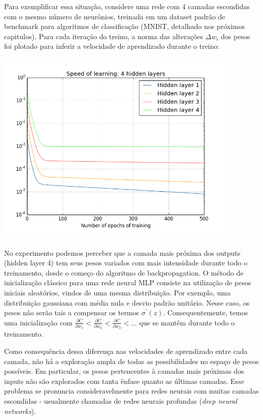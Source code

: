 \documentclass[
	12pt,				%
	oneside,			%
	a4paper,			%
	english,			%
	french,				%
	spanish,			%
	brazil,				%
	]{abntex2}
\begin{document}
Para exemplificar essa situação, considere uma rede com 4 camadas escondidas com o mesmo número de neurônios, treinada em um dataset padrão de benchmark para algoritmos de classificação (MNIST, detalhado nos próximos capitulos). Para cada iteração do treino, a norma das alterações $\Delta w_i$ dos pesos foi plotado para inferir a velocidade de aprendizado durante o treino:

\begin{center}
	\includegraphics[scale=0.8]{vanishinggradient.png}
\end{center}

No experimento podemos perceber que a camada mais próxima dos outputs (hidden layer 4) tem seus pesos variados com mais intensidade durante todo o treinamento, desde o começo do algoritmo de backpropagation. O método de inicialização clássico para uma rede neural MLP consiste na utilização de pesos iniciais aleatórios, vindos de uma mesma distribuição. Por exemplo, uma distribuição gaussiana com média nula e desvio padrão unitário. Nesse caso, os pesos não serão tais a compensar os termos $\sigma^{'}(z)$. Consequentemente, temos uma inicialização com $\frac{\partial C}{\partial w_1} < \frac{\partial C}{\partial w_2} < \frac{\partial C}{\partial w_3} < ... $ que se mantêm durante todo o treinamento.

Como consequência dessa diferença nas velocidades de aprendizado entre cada camada, não há a exploração ampla de todas as possibilidades no espaço de pesos possíveis. Em particular, os pesos pertencentes à camadas mais próximas dos inputs não são explorados com tanta ênfase quanto as últimas camadas. Esse problema se pronuncia consideravelmente para redes neurais com muitas camadas escondidas - usualmente chamadas de redes neurais profundas (\textit{deep neural networks}).
\end{document}
